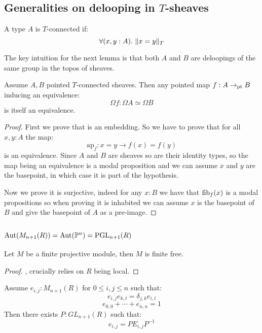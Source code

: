 \subsection{Generalities on delooping in $T$-sheaves}

\begin{definition}
A type $A$ is $T$-connected if:
\[\forall(x,y:A).\ \propTrunc{x=y}_T\]
\end{definition}

The key intuition for the next lemma is that both $A$ and $B$ are deloopings of the same group in the topos of sheaves.

\begin{lemma}\label{deloopings-equivalence}
Assume $A,B$ pointed $T$-connected sheaves. Then any pointed map $f:A\to_{\mathrm{pt}} B$ inducing an equivalence:
\[\Omega f : \Omega A \simeq \Omega B\]
is itself an equivalence.
\end{lemma}

\begin{proof}
First we prove that is an embedding. So we have to prove that for all $x,y:A$ the map:
\[\mathrm{ap}_f : x=y \to f(x)=f(y)\]
is an equivalence. Since $A$ and $B$ are sheaves so are their identity types, so the map being an equivalence is a modal proposition and we can assume $x$ and $y$ are the basepoint, in which case it is part of the hypothesis.

Now we prove it is surjective, indeed for any $x:B$ we have that $\mathrm{fib}_f(x)$ is a modal propositions so when proving it is inhabited we can assume $x$ is the basepoint of $B$ and give the basepoint of $A$ as a pre-image.
\end{proof}


\subsection{$\mathrm{Aut}(M_{n+1}(R)) = \mathrm{Aut}(\mathbb{P}^n) = \operatorname{PGL}_{n+1}(R)$}

\begin{lemma}\label{finite-projective-free}
Let $M$ be a finite projective module, then $M$ is finite free.
\end{lemma}

\begin{proof}
\cite{TODO}, crucially relies on $R$ being local.
\end{proof}

\begin{lemma}\label{fundamental-system-matrices}
Assume $e_{i,j}:M_{n+1}(R)$ for $0\leq i,j\leq n$ such that:
\[e_{i,j}e_{k,l} = \delta_{j,k}e_{i,l}\]
\[e_{0,0}+\cdots+e_{n,n}=1\]
Then there exists $P:GL_{n+1}(R)$ such that:
\[e_{i,j} = PE_{i,j}P^{-1}\]
\end{lemma}

